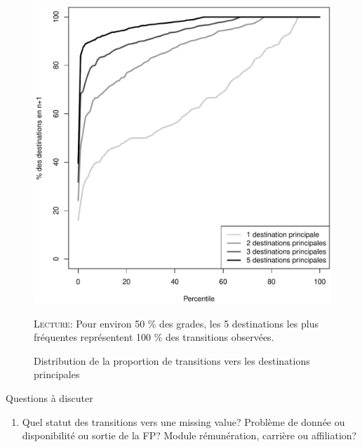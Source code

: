 \documentclass[11pt,a4paper]{article}
\begin{document}
\begin{figure}[t]
  \label{pct}
\caption{Distribution de la proportion de transitions vers les destinations principales}
\vspace{-0.1cm}
\centering
 \includegraphics[width=0.7\linewidth]{pct.pdf}
\vspace{0.1cm}  
\begin{minipage}{12cm}%
\small \textsc{Lecture:} Pour environ 50 \% des grades, les 5 destinations les plus fréquentes représentent 100 \% des transitions observées.  
 \end{minipage}%
\end{figure}


Questions à discuter
\begin{enumerate}[leftmargin=1cm ,parsep=0cm,itemsep=0cm,topsep=0cm] 
\item Quel statut des transitions vers une missing value? Problème de donnée ou disponibilité ou sortie de la FP? Module rémunération, carrière ou affiliation? 
\end{enumerate}




\ifx\isEmbedded\undefined
\newpage
 

\end{document}
